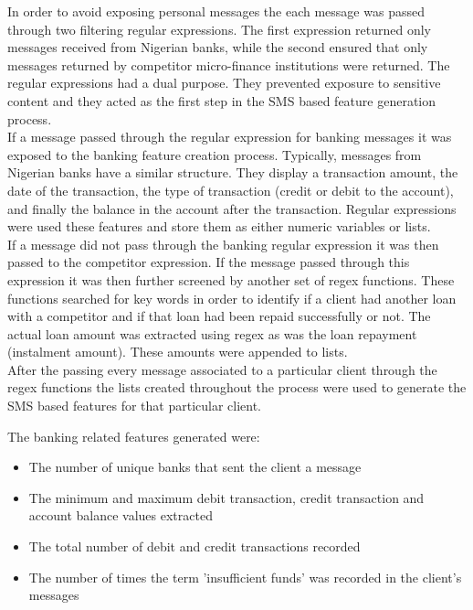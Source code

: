 In order to avoid exposing personal messages the each message was passed through two filtering regular expressions. The first expression returned only messages received from Nigerian banks, while the second ensured that only messages returned by competitor micro-finance institutions were returned. The regular expressions had a dual purpose. They prevented exposure to sensitive content and they acted as the first step in the SMS based feature generation process. \\

If a message passed through the regular expression for banking messages it was exposed to the banking feature creation process. Typically, messages from Nigerian banks have a similar structure. They display a transaction amount, the date of the transaction, the type of transaction (credit or debit to the account), and finally the balance in the account after the transaction. Regular expressions were used these features and store them as either numeric variables or lists.  \\

If a message did not pass through the banking regular expression it was then passed to the competitor expression. If the message passed through this expression it was then further screened by another set of regex functions. These functions searched for key words in order to identify if a client had another loan with a competitor and if that loan had been repaid successfully or not. The actual loan amount was extracted using regex as was the loan repayment (instalment amount). These amounts were appended to lists. \\

After the passing every message associated to a particular client through the regex functions the lists created throughout the process were used to generate the SMS based features for that particular client. \\

\vspace{10pt}

The banking related features generated were:

\begin{itemize}
    \item The number of unique banks that sent the client a message
    \item The minimum and maximum debit transaction, credit transaction and account balance values extracted
    \item The total number of debit and credit transactions recorded
    \item The number of times the term 'insufficient funds' was recorded in the client's messages
\end{itemize}

